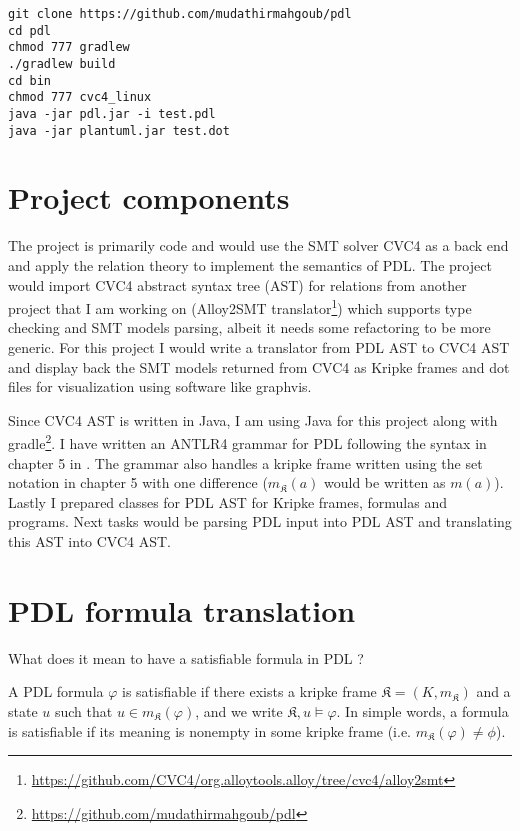 \documentclass[12pt,a4paper]{article}
\begin{document}
\begin{verbatim}
git clone https://github.com/mudathirmahgoub/pdl
cd pdl
chmod 777 gradlew
./gradlew build
cd bin
chmod 777 cvc4_linux
java -jar pdl.jar -i test.pdl 
java -jar plantuml.jar test.dot
\end{verbatim}



\section{Project components}

The project is primarily code and would use the SMT solver CVC4 as a back end and apply the relation theory to implement the semantics of PDL. The project would import CVC4 abstract syntax tree (AST) for relations from another project that I am working on (Alloy2SMT translator\footnote{\url{https://github.com/CVC4/org.alloytools.alloy/tree/cvc4/alloy2smt}}) which supports type checking and SMT models parsing, albeit it needs some refactoring to be more generic.  For this project I would write a translator from PDL AST to CVC4 AST and display back the SMT models returned from CVC4 as Kripke frames and dot files for visualization using software like graphvis.

Since CVC4 AST is written in Java, I am using Java for this project along with  gradle\footnote{\url{https://github.com/mudathirmahgoub/pdl}}. I have written an ANTLR4 grammar for PDL following the syntax in chapter 5 in \cite{dynamic}. The grammar also handles a kripke frame written using the set notation in chapter 5 with one difference ($m_{\mathfrak{K}}(a)$ would be written as $m(a)$). Lastly I  prepared classes for PDL AST for Kripke frames, formulas and programs. Next tasks would be parsing PDL input into PDL AST and translating this AST into CVC4 AST. 


\section{PDL formula translation}

What does it mean to have a satisfiable formula in PDL ?

A PDL formula $\varphi$ is satisfiable if there exists a kripke frame $\mathfrak{K}=(K, m_{\mathfrak{K}})$ and a state  $u$ such that $u \in m_{\mathfrak{K}}(\varphi) $, and we write $\mathfrak{K}, u \models \varphi$. In simple words, a formula is satisfiable if its meaning is nonempty in some kripke frame (i.e. $m_{\mathfrak{K}}(\varphi) \neq \phi$). 
\end{document}
